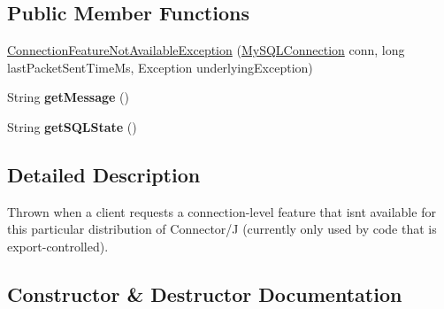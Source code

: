 \subsection*{Public Member Functions}
\begin{DoxyCompactItemize}
\item 
\mbox{\hyperlink{classcom_1_1mysql_1_1jdbc_1_1_connection_feature_not_available_exception_a8ed1c03a5da84f4cf58bef284461681c}{Connection\+Feature\+Not\+Available\+Exception}} (\mbox{\hyperlink{interfacecom_1_1mysql_1_1jdbc_1_1_my_s_q_l_connection}{My\+S\+Q\+L\+Connection}} conn, long last\+Packet\+Sent\+Time\+Ms, Exception underlying\+Exception)
\item 
\mbox{\label{classcom_1_1mysql_1_1jdbc_1_1_connection_feature_not_available_exception_a7f68e2e2645f8fc9f0c9bf114db9871a}} 
String {\bfseries get\+Message} ()
\item 
\mbox{\label{classcom_1_1mysql_1_1jdbc_1_1_connection_feature_not_available_exception_a3d43d2056bf370095b8c868809d0fbae}} 
String {\bfseries get\+S\+Q\+L\+State} ()
\end{DoxyCompactItemize}


\subsection{Detailed Description}
Thrown when a client requests a connection-\/level feature that isn\textquotesingle{}t available for this particular distribution of Connector/J (currently only used by code that is export-\/controlled). 

\subsection{Constructor \& Destructor Documentation}
\mbox{\label{classcom_1_1mysql_1_1jdbc_1_1_connection_feature_not_available_exception_a8ed1c03a5da84f4cf58bef284461681c}} 
